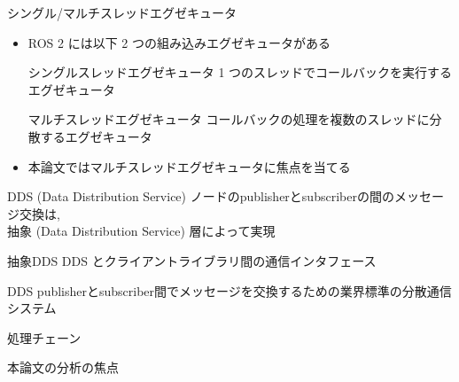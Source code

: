 \begin{frame}{シングル/マルチスレッドエグゼキュータ}
    \begin{itemize}
        \item ROS 2 には以下 2 つの組み込みエグゼキュータがある
              \begin{block}{シングルスレッドエグゼキュータ}
                  1 つのスレッドでコールバックを実行するエグゼキュータ
              \end{block}
              \begin{block}{マルチスレッドエグゼキュータ}
                  コールバックの処理を複数のスレッドに分散するエグゼキュータ
              \end{block}
              \vspace{5mm}

        \item 本論文ではマルチスレッドエグゼキュータに焦点を当てる
    \end{itemize}
\end{frame}

\begin{frame}{DDS (Data Distribution Service)}
    ノードのpublisherとsubscriberの間のメッセージ交換は, \\抽象 (Data Distribution Service) 層によって実現

    \begin{block}{抽象DDS}
        DDS とクライアントライブラリ間の通信インタフェース
    \end{block}
    \begin{block}{DDS}
        publisherとsubscriber間でメッセージを交換するための業界標準の分散通信システム
    \end{block}
\end{frame}

\begin{frame}{処理チェーン}
\end{frame}

\begin{frame}{本論文の分析の焦点}
\end{frame}

